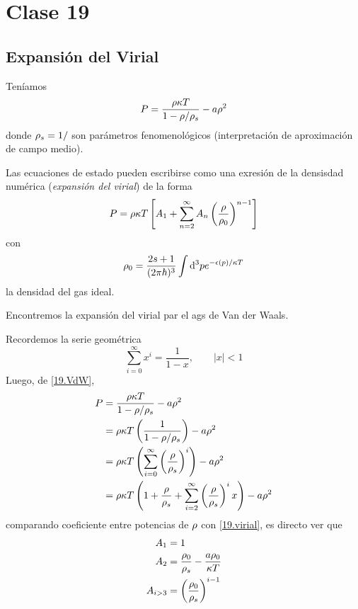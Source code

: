 \section{Clase 19}
\subsection{Expansión del Virial}
Teníamos 
\begin{equation}\label{19.VdW}
  P=\frac{\rho\kappa T}{1-\rho/\rho_s}-a\rho^2
\end{equation}
donde $\rho_s=1/$ son parámetros fenomenológicos (interpretación de aproximación de campo medio).

Las ecuaciones de estado pueden escribirse como una exresión de la densisdad numérica (\textit{expansión del virial}) de la forma
\begin{equation}\label{19.virial}
  P=\rho\kappa T\left[A_1+\sum_{n=2}^\infty A_n\left(\frac{\rho }{\rho_0}\right)^{n-1}\right]
\end{equation}
con
\begin{equation}
  \rho_0=\frac{2s+1}{(2\pi\hbar)^3}\int\dd^3 pe^{-\epsilon(p)/\kappa T}
\end{equation}
la densidad del gas ideal.

\begin{ej}
	Encontremos la expansión del virial par el ags de Van der Waals.
\end{ej}

\begin{sol}
	Recordemos la serie geométrica
	\begin{equation}
  \sum_{i=0}^\infty x^{i}=\frac{1}{1-x},\qquad |x|<1
\end{equation}
Luego, de \eqref{19.VdW},
\begin{align}
  P&=\frac{\rho\kappa T}{1-\rho/\rho_s}-a\rho^2\\
  &=\rho\kappa T\left(\frac{1}{1-\rho/\rho_s}\right)-a\rho^2\\
  &=\rho\kappa T\left(\sum_{i=0}^\infty\left(\frac{\rho }{\rho_s}\right)^{i}\right)-a\rho^2\\
  &=\rho\kappa T\left(1+\frac{\rho}{\rho_s}+\sum_{i=2}^\infty\left(\frac{\rho }{\rho_s}\right)^{i}x\right)-a\rho^2
\end{align}
comparando coeficiente entre potencias de $\rho$ con \eqref{19.virial}, es directo ver que
\begin{align}
  A_1&=1\\
  A_2&=\frac{\rho_0}{\rho_s}-\frac{a\rho_0}{\kappa T}\\
  A_{i>3}&=\left(\frac{\rho_0}{\rho_s}\right)^{i-1}
\end{align}
\end{sol}

